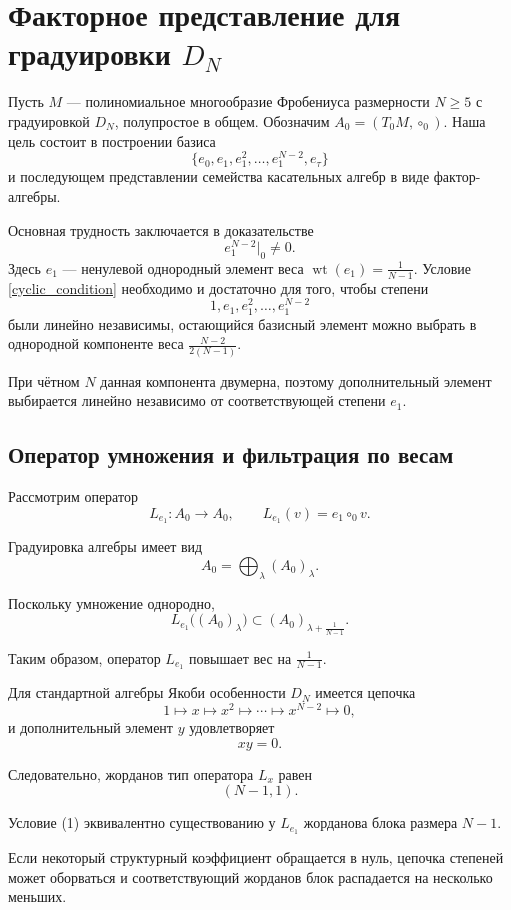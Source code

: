 \section{Факторное представление для градуировки $D_N$}

Пусть $M$ --- полиномиальное многообразие Фробениуса
размерности $N\geq 5$ с градуировкой $D_N$,
полупростое в общем.
Обозначим \(A_0=(T_0M,\circ_0).\)
Наша цель состоит в построении базиса
\[\{e_0,e_1,e_1^2,\ldots,e_1^{N-2},e_\tau\}\]
и последующем представлении семейства касательных
алгебр в виде фактор-алгебры.

Основная трудность заключается в доказательстве
\begin{equation}
e_1^{N-2}\big|_0\neq 0.
\label{cyclic_condition}
\end{equation}
Здесь $e_1$ --- ненулевой однородный элемент веса \(\operatorname{wt}(e_1)=\frac{1}{N-1}.\)
Условие \ref{cyclic_condition} необходимо и достаточно для того,
чтобы степени
\[1,e_1,e_1^2,\ldots,e_1^{N-2}\]
были линейно независимы, остающийся базисный элемент можно выбрать в
однородной компоненте веса
\(\frac{N-2}{2(N-1)}.\)

При чётном $N$ данная компонента двумерна,
поэтому дополнительный элемент выбирается
линейно независимо от соответствующей степени
$e_1$.
\iffalse
\subsection{Оператор умножения и фильтрация по весам}

Рассмотрим оператор
\[
L_{e_1}:A_0\longrightarrow A_0,
\qquad
L_{e_1}(v)=e_1\circ_0 v.
\]

Градуировка алгебры имеет вид
\[
A_0=\bigoplus_\lambda (A_0)_\lambda.
\]

Поскольку умножение однородно,
\[
L_{e_1}\bigl((A_0)_\lambda\bigr)
\subset
(A_0)_{\lambda+\frac{1}{N-1}}.
\]

Таким образом, оператор $L_{e_1}$ повышает
вес на $\frac{1}{N-1}$.

Для стандартной алгебры Якоби особенности $D_N$
имеется цепочка
\[
1\longmapsto x\longmapsto x^2
\longmapsto\cdots\longmapsto x^{N-2}
\longmapsto 0,
\]
и дополнительный элемент $y$ удовлетворяет
\[
xy=0.
\]

Следовательно, жорданов тип оператора $L_x$
равен
\[
\boxed{(N-1,1).}
\]

Условие (1) эквивалентно существованию у
$L_{e_1}$ жорданова блока размера $N-1$.

Если некоторый структурный коэффициент
обращается в нуль, цепочка степеней
может оборваться и соответствующий жорданов
блок распадается на несколько меньших.

